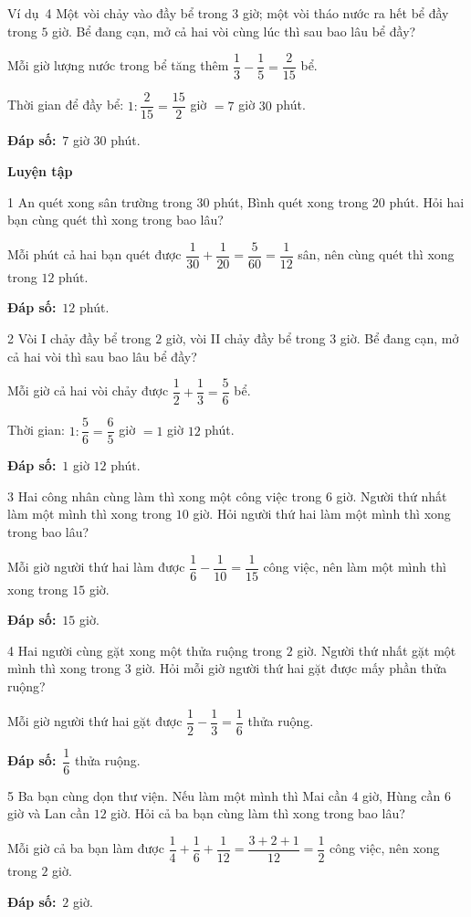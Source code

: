 \documentclass[11pt]{article}
\newif\ifsol \solfalse
\providecommand{\AnsWord}{Đáp số}
\newcommand{\dapso}[1]{\par\textbf{\AnsWord:}\ #1}
\newcommand{\guide}{\par\vspace{4pt}{\bfseries\color{tmBlue}\GuideWord}\par\vspace{3pt}\nopagebreak}
\newcommand{\probsol}[1]{%
  \begin{lrbox}{\solmeasure}\begin{minipage}{\dimexpr\linewidth-24pt\relax}#1\end{minipage}\end{lrbox}%
  \ifsol
    \begin{solbox}#1\end{solbox}%
  \else
    \setlength{\solht}{\dimexpr\ht\solmeasure+\dp\solmeasure+0.85cm\relax}%
    \ifdim\solht<1.35cm\setlength{\solht}{1.35cm}\fi
    \begin{tcolorbox}[colback=white,colframe=Line,boxrule=0.8pt,arc=5pt,
      left=8pt,right=8pt,top=4pt,bottom=4pt,height=\solht]{\footnotesize\color{Slate}\itshape\WorkWord}\end{tcolorbox}%
  \fi}
\newcommand{\dividerbar}[1]{\par\vspace{0.6em}\noindent
  \begin{tcolorbox}[enhanced,frame hidden,interior hidden,borderline west={5pt}{0pt}{ProbBlue},
    colback=white,left=12pt,right=12pt,top=5pt,bottom=5pt,arc=4pt]
  {\large\bfseries\color{ProbBlue} #1}\end{tcolorbox}\vspace{0.4em}}
\newcommand{\gap}{\vspace{0.3cm}}
\def\GuideWord{Hướng dẫn giải.}
\def\WorkWord{Bài làm:}
\def\AnsWord{Đáp số}
\def\ExWord{Ví dụ}
\begin{document}
\gap
\begin{exbox}{\ExWord\ 4}
Một vòi chảy vào đầy bể trong $3$ giờ; một vòi tháo nước ra hết bể đầy trong $5$ giờ. Bể đang cạn, mở cả hai vòi cùng lúc thì sau bao lâu bể đầy?
\guide
Mỗi giờ lượng nước trong bể tăng thêm $\dfrac13-\dfrac15=\dfrac2{15}$ bể.\par
Thời gian để đầy bể: $1:\dfrac2{15}=\dfrac{15}2$ giờ $=7$ giờ $30$ phút.
\dapso{$7$ giờ $30$ phút.}
\end{exbox}
\dividerbar{Luyện tập}
\begin{probbox}{1}{\relax}
An quét xong sân trường trong $30$ phút, Bình quét xong trong $20$ phút. Hỏi hai bạn cùng quét thì xong trong bao lâu?
\end{probbox}
\probsol{
Mỗi phút cả hai bạn quét được $\dfrac1{30}+\dfrac1{20}=\dfrac5{60}=\dfrac1{12}$ sân, nên cùng quét thì xong trong $12$ phút.
\dapso{$12$ phút.}}
\gap
\begin{probbox}{2}{\relax}
Vòi I chảy đầy bể trong $2$ giờ, vòi II chảy đầy bể trong $3$ giờ. Bể đang cạn, mở cả hai vòi thì sau bao lâu bể đầy?
\end{probbox}
\probsol{
Mỗi giờ cả hai vòi chảy được $\dfrac12+\dfrac13=\dfrac56$ bể.\par Thời gian: $1:\dfrac56=\dfrac65$ giờ $=1$ giờ $12$ phút.
\dapso{$1$ giờ $12$ phút.}}
\gap
\begin{probbox}{3}{\relax}
Hai công nhân cùng làm thì xong một công việc trong $6$ giờ. Người thứ nhất làm một mình thì xong trong $10$ giờ. Hỏi người thứ hai làm một mình thì xong trong bao lâu?
\end{probbox}
\probsol{
Mỗi giờ người thứ hai làm được $\dfrac16-\dfrac1{10}=\dfrac1{15}$ công việc, nên làm một mình thì xong trong $15$ giờ.
\dapso{$15$ giờ.}}
\gap
\begin{probbox}{4}{\relax}
Hai người cùng gặt xong một thửa ruộng trong $2$ giờ. Người thứ nhất gặt một mình thì xong trong $3$ giờ. Hỏi mỗi giờ người thứ hai gặt được mấy phần thửa ruộng?
\end{probbox}
\probsol{
Mỗi giờ người thứ hai gặt được $\dfrac12-\dfrac13=\dfrac16$ thửa ruộng.
\dapso{$\dfrac16$ thửa ruộng.}}
\gap
\begin{probbox}{5}{\relax}
Ba bạn cùng dọn thư viện. Nếu làm một mình thì Mai cần $4$ giờ, Hùng cần $6$ giờ và Lan cần $12$ giờ. Hỏi cả ba bạn cùng làm thì xong trong bao lâu?
\end{probbox}
\probsol{
Mỗi giờ cả ba bạn làm được $\dfrac14+\dfrac16+\dfrac1{12}=\dfrac{3+2+1}{12}=\dfrac12$ công việc, nên xong trong $2$ giờ.
\dapso{$2$ giờ.}}
\end{document}
